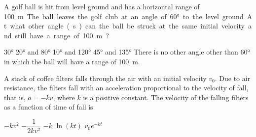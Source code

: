 \documentclass{../../oss-apphys-exam}
\begin{document}


\raggedcolumns

\begin{multicols*}{2}
  \begin{questions}
    \question A golf ball is hit from level ground and has a horizontal range of
    \SI{100}\metre. The ball leaves the golf club at an angle of \ang{60} to
    the level ground. At what other angle(s) can the ball be struck at the same
    initial velocity and still have a range of \SI{100}\metre?
    \begin{center}
    \end{center}
    \begin{choices}
      \choice\ang{30}
      \choice\ang{20} and \ang{80}
      \choice\ang{10} and \ang{120}
      \choice\ang{45} and \ang{135}
      \choice There is no other angle other than \ang{60} in which the ball will
      have a range of \SI{100}\metre.
    \end{choices}
    \vspace{.7in}
      
    \question A stack of coffee filters falls through the air with an initial
    velocity $v_0$. Due to air resistance, the filters fall with an
    acceleration proportional to the velocity of fall, that is, $a=-kv$, where
    $k$ is a positive constant. The velocity of the falling filters as a
    function of time of fall is
    \begin{choices}
      \choice $-kv^2$
      \choice $-\dfrac1{2kv^2}$
      \choice $-k$
      \choice $\ln(kt)$
      \choice $v_0e^{-kt}$
    \end{choices}
    

\end{questions}
\end{multicols*}
\end{document}
